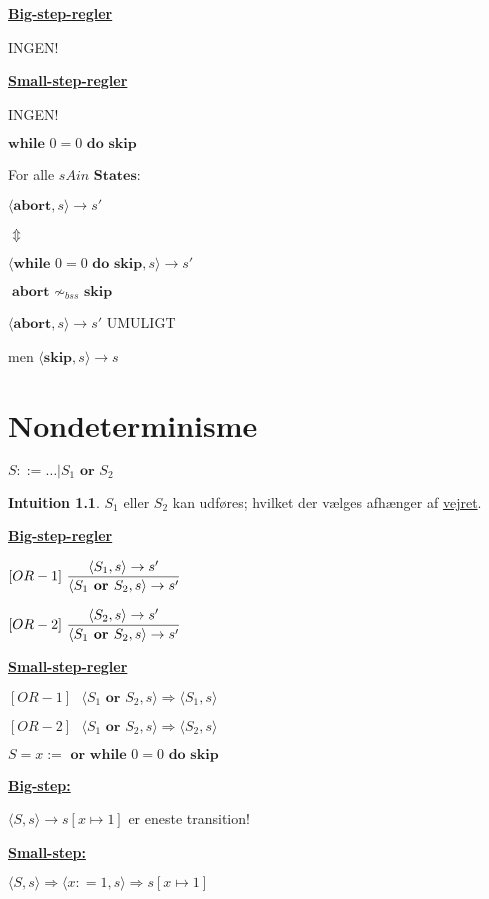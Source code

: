 \documentclass[a4paper,10pt,article]{memoir}
\theoremstyle{definition}
\newtheorem{intuition}{Intuition}
\begin{document}
\underline{\textbf{Big-step-regler}}

INGEN!

\underline{\textbf{Small-step-regler}}

INGEN!

$\textbf{while } 0 = 0 \textbf{ do skip}$

For alle $s Ain \textbf{ States}$:

$\langle \textbf{abort},s \rangle \rightarrow s'$

$\Updownarrow$

$\langle \textbf{while } 0 = 0 \textbf{ do skip},s \rangle \rightarrow s'$

$\textbf{abort } \nsim_{bss} \textbf{ skip}$

$\langle \textbf{abort},s \rangle \rightarrow s'$ UMULIGT

men $\langle \textbf{skip},s \rangle \rightarrow s$

\chapter{Nondeterminisme}
$S::= \dots | S_1 \textbf{ or } S_2$

\begin{intuition}
$S_1$ eller $S_2$ kan udføres; hvilket der vælges afhænger af \underline{vejret}.
\end{intuition}
\underline{\textbf{Big-step-regler}}

$[OR-1] \text{   } \dfrac{\langle S_1,s \rangle \rightarrow s'}{\langle S_1 \textbf{ or } S_2,s \rangle \rightarrow s'}$ 

$[OR-2] \text{   } \dfrac{\langle S_2,s \rangle \rightarrow s'}{\langle S_1 \textbf{ or } S_2,s \rangle \rightarrow s'}$

\underline{\textbf{Small-step-regler}}

$[OR-1] \text{  } \langle S_1 \textbf{ or } S_2,s \rangle \Rightarrow \langle S_1,s \rangle$

$[OR-2] \text{  } \langle S_1 \textbf{ or } S_2,s \rangle \Rightarrow \langle S_2,s \rangle$



$S = x:= \textbf{ or while } 0=0 \textbf{ do skip}$

\underline{\textbf{Big-step:}}

$\langle S,s \rangle \rightarrow s[x \mapsto 1]$ er eneste transition!

\underline{\textbf{Small-step:}}

$\langle S,s \rangle \Rightarrow \langle x : = 1,s \rangle \Rightarrow s[x \mapsto 1]$
\end{document}
